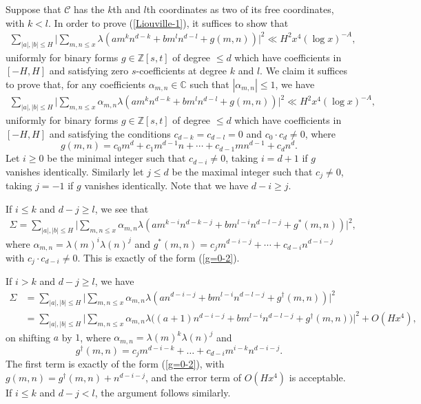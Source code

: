 \documentclass[reqno, 11pt]{amsart}
\renewcommand{\leq}{\leqslant}
\renewcommand{\geq}{\geqslant}
\theoremstyle{definition}
\theoremstyle{definition}
\renewcommand{\geq}{\geqslant}
\renewcommand{\leq}{\leqslant}
\newcommand{\CC}{\mathbb{C}}
\newcommand{\CCC}{\mathcal{C}}
\newcommand{\ZZ}{\mathbb{Z}}
\numberwithin{equation}{section}
\begin{document}
Suppose that $\CCC$ has the $k$th and $l$th coordinates as two of its free coordinates, with $k<l$. In order to prove (\ref{Liouville-1}), it suffices to show that
\begin{eqnarray}\label{g=0-1}
	\sum_{|a|,|b| \leq H} \Bigg| \sum_{m,n \leq x} \lambda(am^kn^{d-k} + bm^ln^{d-l} + g(m,n)) \Bigg|^2 \ll H^2 x^4 (\log x)^{-A},
\end{eqnarray}
uniformly for binary forms $g \in \ZZ[s,t]$ of degree $\leq d$ which have coefficients in $[-H,H]$ and satisfying zero $s$-coefficients at degree $k$ and $l$. We claim it suffices to prove that, for any coefficients $\alpha_{m,n} \in \CC$ such that $|\alpha_{m,n}| \leq 1$, we have
\begin{eqnarray}\label{g=0-2}
	\sum_{|a|,|b| \leq H} \Bigg| \sum_{m,n \leq x} \alpha_{m, n}\lambda(am^kn^{d-k} + bm^ln^{d-l} + g(m,n)) \Bigg|^2 \ll H^2 x^4 (\log x)^{-A},
\end{eqnarray}
uniformly for binary forms $g \in \ZZ[s,t]$ of degree $\leq d$ which have coefficients in $[-H,H]$ and satisfying the conditions $c_{d-k} = c_{d-l} = 0$ and $c_0 \cdot c_d \neq 0$, where
$$g(m, n) = c_0 m^d + c_1 m^{d-1}n + \cdots + c_{d-1}m n^{d-1} + c_d n^d.$$ 
Let $i \geq 0$ be the minimal integer such that $c_{d-i} \neq 0$, taking $i = d + 1$ if $g$ vanishes identically. Similarly let $j \leq d$ be the maximal integer such that $c_j \neq 0$, taking $j = -1$ if $g$ vanishes identically. Note that we have $d-i \geq j$.

If $i \leq k$ and $d-j \geq l$, we see that
\begin{align*}
\Sigma  = \sum_{|a|,|b| \leq H} \Bigg| \sum_{m,n \leq x} \alpha_{m,n} \lambda(am^{k-i}n^{d-k-j} + bm^{l-i}n^{d-l-j} + g^{*}(m,n)) \Bigg|^2,
\end{align*}
where $\alpha_{m,n} = \lambda(m)^i \lambda(n)^j$ and $g^{*}(m,n) =  c_{j}m^{d-i-j}  + \cdots + c_{d-i}n^{d-i-j}$ with $c_j \cdot c_{d-i} \neq 0$. This is exactly of the form (\ref{g=0-2}).

If $i > k$ and $d-j \geq l$, we have
\begin{align*}
\Sigma & = \sum_{|a|,|b| \leq H} \Bigg| \sum_{m,n \leq x} \alpha_{m,n} \lambda(an^{d-i-j} + bm^{l-i}n^{d-l-j} + g^{\dagger}(m,n)) \Bigg|^2 \\
& = \sum_{|a|,|b| \leq H} \Bigg| \sum_{m,n \leq x} \alpha_{m,n} \lambda\big((a+1)n^{d-i-j} + bm^{l-i}n^{d-l-j} + g^{\dagger}(m,n)\big) \Bigg|^2 + O(Hx^4),
\end{align*}
on shifting $a$ by $1$, where $\alpha_{m, n} = \lambda(m)^k \lambda(n)^j$ and 
$$g^{\dagger}(m, n) = c_j m^{d-i-k} + \dots + c_{d-i}m^{i-k}n^{d-i-j}.$$
The first term is exactly of the form (\ref{g=0-2}), with $g(m, n) = g^{\dagger}(m, n) + n^{d-i-j}$, and the error term of $O(Hx^4)$ is acceptable.
If $i \leq k$ and $d-j < l$, the argument follows similarly.
\end{document}
